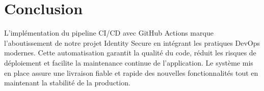 \section*{Conclusion}
L'implémentation du pipeline CI/CD avec GitHub Actions marque l'aboutissement de notre projet Identity Secure en intégrant les pratiques DevOps modernes. Cette automatisation garantit la qualité du code, réduit les risques de déploiement et facilite la maintenance continue de l'application. Le système mis en place assure une livraison fiable et rapide des nouvelles fonctionnalités tout en maintenant la stabilité de la production.
